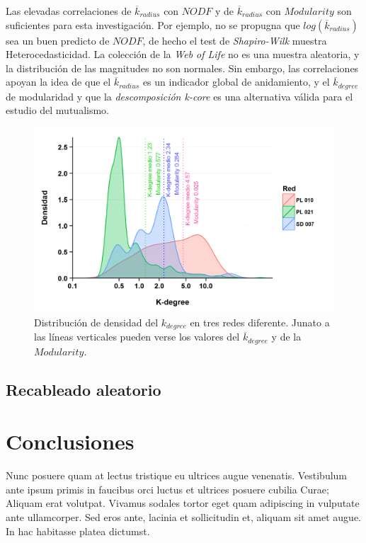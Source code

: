 Las elevadas correlaciones de $\overline {k}_{radius}$ con $NODF$ y de $\overline {k}_{radius}$ con $Modularity$ son suficientes para esta investigación. Por ejemplo, no se propugna que $log(\overline {k}_{radius})$ sea un buen predicto de $NODF$, de hecho el test de \textit{Shapiro-Wilk} muestra Heterocedasticidad. La colección de la \textit{Web of Life} no es una muestra aleatoria, y la distribución de las magnitudes no son normales. Sin embargo, las correlaciones apoyan la idea de que el $\overline {k}_{radius}$ es un indicador global de anidamiento, y el $\overline {k}_{degree}$ de modularidad y que la \textit{descomposición k-core} es una alternativa válida para el estudio del mutualismo.

\begin{figure}[h!]
\centering
\includegraphics[scale=1]{ESTATICA_density_plots.png}
\caption {Distribución de densidad del $k_{degree}$ en tres redes diferente. Junato a las líneas verticales pueden verse los valores del $\overline {k}_{degree}$ y de la $Modularity$.}
\label{fig:ESTATICA_density_plots}
\end{figure}

\subsection{Recableado aleatorio}

\section{Conclusiones}

Nunc posuere quam at lectus tristique eu ultrices augue venenatis. Vestibulum ante ipsum primis in faucibus orci luctus et ultrices posuere cubilia Curae; Aliquam erat volutpat. Vivamus sodales tortor eget quam adipiscing in vulputate ante ullamcorper. Sed eros ante, lacinia et sollicitudin et, aliquam sit amet augue. In hac habitasse platea dictumst.
